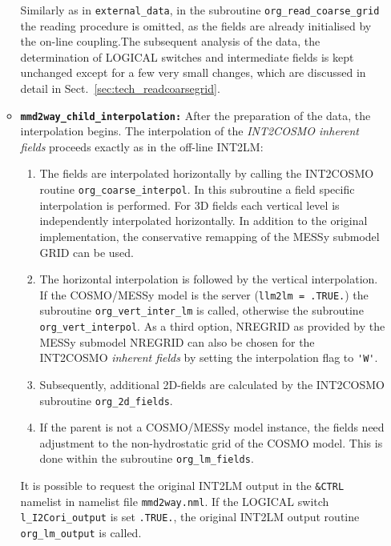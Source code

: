 \documentclass[11pt,twoside]{article}
\begin{document}
\begin{enumerate}
\begin{itemize}
Similarly as in \verb|external_data|, in the subroutine 
\verb|org_read_coarse_grid| the reading procedure is omitted, as the fields are 
already initialised by the on-line coupling.The subsequent analysis of the data,
the determination of {\footnotesize LOGICAL }switches and intermediate fields is kept unchanged
except for a few very small changes, which are discussed in detail in Sect.\ 
\ref{sec:tech_readcoarsegrid}.

\item {\tt \bf mmd2way\_child\_interpolation:}
After the preparation of the data, the interpolation begins.
The interpolation of the {\it INT2COSMO inherent fields} proceeds exactly
as in the off-line INT2LM:
\begin{enumerate} 
\item The fields are interpolated horizontally
by calling the INT2COSMO routine \verb|org_coarse_interpol|. In this 
subroutine a field specific interpolation is performed. For 3D fields each
vertical level is independently interpolated horizontally.
In addition to the original implementation, the conservative remapping
of the MESSy submodel GRID can be used. 
\item The horizontal interpolation is followed by the vertical interpolation.
If the COSMO/MESSy model is the server (\verb|llm2lm = .TRUE.|) the subroutine
\verb|org_vert_inter_lm| is called, otherwise the subroutine 
\verb|org_vert_interpol|. As a third option, NREGRID as provided by
the MESSy submodel NREGRID can also be chosen for the INT2COSMO {\it
inherent fields} by setting the interpolation flag to \verb|'W'|.
\item Subsequently, additional 2D-fields are calculated by the INT2COSMO
subroutine \verb|org_2d_fields|. 
\item If the parent is not a COSMO/MESSy model instance, the fields
need adjustment to the non-hydrostatic grid of the COSMO model. 
 This is done within the subroutine \verb|org_lm_fields|. 
\end{enumerate}

It is possible to request the original INT2LM output in the \verb|&CTRL|
namelist in namelist file \verb|mmd2way.nml|. If the {\footnotesize
LOGICAL }switch  
\verb|l_I2Cori_output| is set \verb|.TRUE.|, the original INT2LM output
routine \verb|org_lm_output| is called.


\end{itemize}
\end{enumerate}
\end{document}

